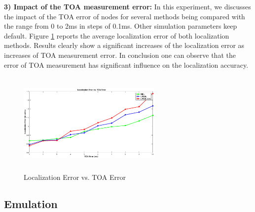 \textbf{3) Impact of the TOA measurement error:}
In this experiment, we discusses the impact of the TOA error of nodes for several methods being compared with the range from 0 to 2ms in steps of 0.1ms. 
Other simulation parameters keep default. 
Figure \ref{fig6} reports the average localization error of both localization methods. 
Results clearly show a significant increases of the localization error as increases of TOA measurement error.
In conclusion one can observe that the error of TOA measurement has significant influence on the localization accuracy. 
  \begin{figure}[htb]       
            \centering
			\vspace{-3mm}
            \includegraphics[height=5.0cm,width=7.0cm]{image/TOA.eps}
                \caption{Localization Error vs. TOA Error}
             \vspace{-8mm}
             \label{fig6}
        \end{figure}

  \subsection{Emulation}

